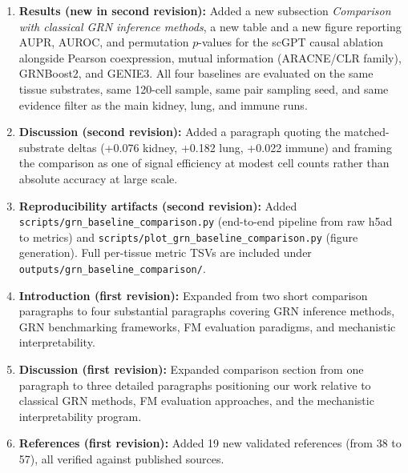 \documentclass[11pt,letterpaper]{article}
\begin{document}
\begin{enumerate}[leftmargin=2em]
\item \textbf{Results (new in second revision):} Added a new subsection
  \textit{Comparison with classical GRN inference methods}, a new table
  and a new figure reporting AUPR, AUROC, and permutation
  $p$-values for the scGPT causal ablation alongside Pearson
  coexpression, mutual information (ARACNE/CLR family), GRNBoost2, and
  GENIE3. All four baselines are evaluated on the same tissue substrates,
  same 120-cell sample, same pair sampling seed, and same evidence
  filter as the main kidney, lung, and immune runs.

\item \textbf{Discussion (second revision):} Added a paragraph quoting
  the matched-substrate deltas (+0.076 kidney, +0.182 lung, +0.022
  immune) and framing the comparison as one of signal efficiency at
  modest cell counts rather than absolute accuracy at large scale.

\item \textbf{Reproducibility artifacts (second revision):} Added
  \texttt{scripts/grn\_baseline\_comparison.py} (end-to-end pipeline
  from raw h5ad to metrics) and
  \texttt{scripts/plot\_grn\_baseline\_comparison.py} (figure
  generation). Full per-tissue metric TSVs are included under
  \texttt{outputs/grn\_baseline\_comparison/}.

\item \textbf{Introduction (first revision):} Expanded from two short
  comparison paragraphs to four substantial paragraphs covering GRN
  inference methods, GRN benchmarking frameworks, FM evaluation
  paradigms, and mechanistic interpretability.

\item \textbf{Discussion (first revision):} Expanded comparison section
  from one paragraph to three detailed paragraphs positioning our work
  relative to classical GRN methods, FM evaluation approaches, and the
  mechanistic interpretability program.

\item \textbf{References (first revision):} Added 19 new validated
  references (from 38 to 57), all verified against published sources.
\end{enumerate}
\end{document}
